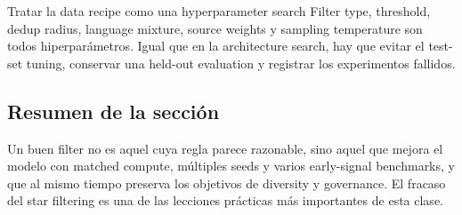 
\begin{importantbox}{Tratar la data recipe como una hyperparameter search}
Filter type, threshold, dedup radius, language mixture, source weights y sampling temperature son todos hiperparámetros. Igual que en la architecture search, hay que evitar el test-set tuning, conservar una held-out evaluation y registrar los experimentos fallidos.
\end{importantbox}

\subsection{Resumen de la sección}

Un buen filter no es aquel cuya regla parece razonable, sino aquel que mejora el modelo con matched compute, múltiples seeds y varios early-signal benchmarks, y que al mismo tiempo preserva los objetivos de diversity y governance. El fracaso del star filtering es una de las lecciones prácticas más importantes de esta clase.
